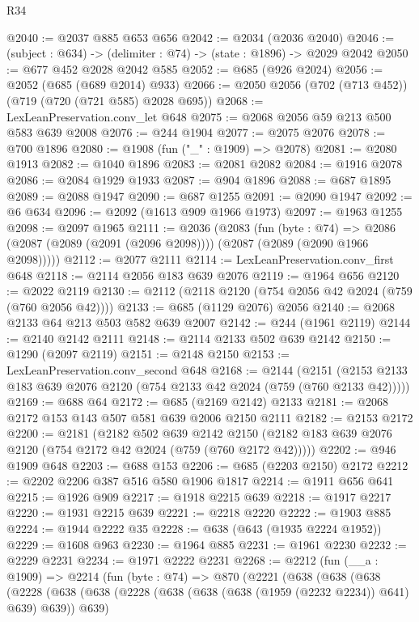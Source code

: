 \begin{lexlean}{R34}
\begin{coremodule}
@2040 := @2037 @885 @653 @656
@2042 := @2034 (@2036 @2040)
@2046 := (subject : @634) -> (delimiter : @74) -> (state : @1896) -> @2029 @2042
@2050 := @677 @452 @2028 @2042 @585
@2052 := @685 (@926 @2024)
@2056 := @2052 (@685 (@689 @2014) @933)
@2066 := @2050 @2056 (@702 (@713 @452)) (@719 (@720 (@721 @585) @2028 @695))
@2068 := LexLeanPreservation.conv_let @648
@2075 := @2068 @2056 @59 @213 @500 @583 @639 @2008
@2076 := @244 @1904
@2077 := @2075 @2076
@2078 := @700 @1896
@2080 := @1908 (fun ("_" : @1909) => @2078)
@2081 := @2080 @1913
@2082 := @1040 @1896
@2083 := @2081 @2082
@2084 := @1916 @2078
@2086 := @2084 @1929 @1933
@2087 := @904 @1896
@2088 := @687 @1895
@2089 := @2088 @1947
@2090 := @687 @1255
@2091 := @2090 @1947
@2092 := @6 @634
@2096 := @2092 (@1613 @909 @1966 @1973)
@2097 := @1963 @1255
@2098 := @2097 @1965
@2111 := @2036
    (@2083
      (fun (byte : @74) =>
      @2086 (@2087 (@2089 (@2091 (@2096 @2098)))) (@2087 (@2089 (@2090 @1966 @2098)))))
@2112 := @2077 @2111
@2114 := LexLeanPreservation.conv_first @648
@2118 := @2114 @2056 @183 @639 @2076
@2119 := @1964 @656
@2120 := @2022 @2119
@2130 := @2112 (@2118 @2120 (@754 @2056 @42 @2024 (@759 (@760 @2056 @42))))
@2133 := @685 (@1129 @2076) @2056
@2140 := @2068 @2133 @64 @213 @503 @582 @639 @2007
@2142 := @244 (@1961 @2119)
@2144 := @2140 @2142 @2111
@2148 := @2114 @2133 @502 @639 @2142
@2150 := @1290 (@2097 @2119)
@2151 := @2148 @2150
@2153 := LexLeanPreservation.conv_second @648
@2168 := @2144
    (@2151 (@2153 @2133 @183 @639 @2076 @2120 (@754 @2133 @42 @2024 (@759 (@760 @2133 @42)))))
@2169 := @688 @64
@2172 := @685 (@2169 @2142) @2133
@2181 := @2068 @2172 @153 @143 @507 @581 @639 @2006 @2150 @2111
@2182 := @2153 @2172
@2200 := @2181
    (@2182
      @502
      @639
      @2142
      @2150
      (@2182 @183 @639 @2076 @2120 (@754 @2172 @42 @2024 (@759 (@760 @2172 @42)))))
@2202 := @946 @1909 @648
@2203 := @688 @153
@2206 := @685 (@2203 @2150) @2172
@2212 := @2202 @2206 @387 @516 @580 @1906 @1817
@2214 := @1911 @656 @641
@2215 := @1926 @909
@2217 := @1918 @2215 @639
@2218 := @1917 @2217
@2220 := @1931 @2215 @639
@2221 := @2218 @2220
@2222 := @1903 @885
@2224 := @1944 @2222 @35
@2228 := @638 (@643 (@1935 @2224 @1952))
@2229 := @1608 @963
@2230 := @1964 @885
@2231 := @1961 @2230
@2232 := @2229 @2231
@2234 := @1971 @2222 @2231
@2268 := @2212
    (fun (__a : @1909) =>
    @2214
      (fun (byte : @74) =>
      @870
        (@2221
          (@638
            (@638
              (@638
                (@2228
                  (@638
                    (@638 (@2228 (@638 (@638 (@638 (@1959 (@2232 @2234)) @641) @639) @639)) @639)

\end{coremodule}
\end{lexlean}
